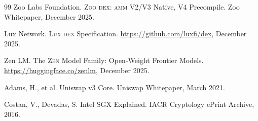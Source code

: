 \documentclass[11pt,letterpaper]{article}
\newcommand{\Zoo}{\textsc{Zoo}}
\newcommand{\Lux}{\textsc{Lux}}
\newcommand{\Zen}{\textsc{Zen}}
\newcommand{\AMM}{\textsc{amm}}
\newcommand{\DEX}{\textsc{dex}}
\begin{document}
\begin{thebibliography}{99}
Zoo Labs Foundation.
\newblock \Zoo{} \DEX{}: \AMM{} V2/V3 Native, V4 Precompile.
\newblock Zoo Whitepaper, December 2025.

Lux Network.
\newblock \Lux{} \DEX{} Specification.
\newblock \url{https://github.com/luxfi/dex}, December 2025.

Zen LM.
\newblock The \Zen{} Model Family: Open-Weight Frontier Models.
\newblock \url{https://huggingface.co/zenlm}, December 2025.

Adams, H., et al.
\newblock Uniswap v3 Core.
\newblock Uniswap Whitepaper, March 2021.

Costan, V., Devadas, S.
\newblock Intel SGX Explained.
\newblock IACR Cryptology ePrint Archive, 2016.

\end{thebibliography}
\end{document}
